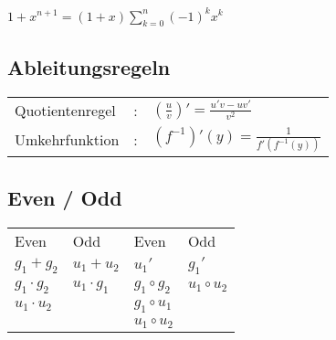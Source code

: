 \documentclass[10pt,a4paper]{scrartcl}
\begin{document}
\begin{multicols*}{3}
	$1 + x^{n+1}=(1+x)\sum_{k=0}^{n}{(-1)^kx^k}$
	
	\subsection{Ableitungsregeln}
	
	\begin{tabular}{lcl}
	Quotientenregel	&:&	$(\frac{u}{v})'=\frac{u'v-uv'}{v^2}$\\
	Umkehrfunktion	&:&	$(f^{-1})'(y)=\frac{1}{f'(f^{-1}(y))}$\\
	
	\end{tabular}
	
	\subsection{Even / Odd}	
		
	\begin{tabularx}{\linewidth}{|X|X|X|X}
	Even		&Odd		&Even 		&Odd\\
	$g_1+g_2$&$u_1+u_2$& $u_1'$&$g_1'$ \rule{0pt}{1ex}\\	
	$g_1\cdot g_2$&$u_1\cdot g_1$&$g_1\circ g_2$&$u_1\circ u_2$\rule{0pt}{4ex}\\
	$u_1\cdot u_2$&&$g_1\circ u_1$&\\
	&&$u_1\circ u_2$&\\
	\end{tabularx}	
	
	\end{multicols*}

	
\end{document}

